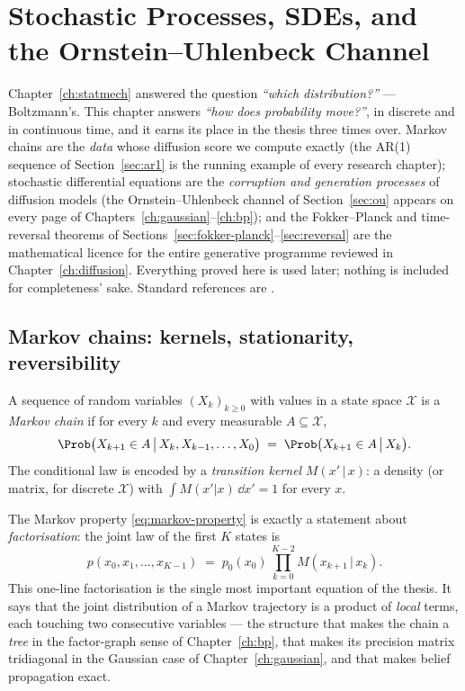 \chapter{Stochastic Processes, SDEs, and the Ornstein--Uhlenbeck Channel}
\label{ch:stochproc}\label{ch:sde}

Chapter~\ref{ch:statmech} answered the question \emph{``which
distribution?''} --- Boltzmann's. This chapter answers \emph{``how does
probability move?''}, in discrete and in continuous time, and it earns its
place in the thesis three times over. Markov chains are the \emph{data}
whose diffusion score we compute exactly (the AR(1) sequence of
Section~\ref{sec:ar1} is the running example of every research chapter);
stochastic differential equations are the \emph{corruption and generation
processes} of diffusion models (the Ornstein--Uhlenbeck channel of
Section~\ref{sec:ou} appears on every page of
Chapters~\ref{ch:gaussian}--\ref{ch:bp}); and the Fokker--Planck and
time-reversal theorems of Sections~\ref{sec:fokker-planck}--\ref{sec:reversal}
are the mathematical licence for the entire generative programme reviewed in
Chapter~\ref{ch:diffusion}. Everything proved here is used later; nothing is
included for completeness' sake. Standard references are
\citet{robert2004monte, brockwell1991time, oksendal2003stochastic,
gardiner2009stochastic, risken1996fokker}.

\section{Markov chains: kernels, stationarity, reversibility}
\label{sec:markov}

\begin{definition}
A sequence of random variables $(X_k)_{k \geq 0}$ with values in a state
space $\mathcal{X}$ is a \emph{Markov chain} if for every $k$ and every
measurable $A \subseteq \mathcal{X}$,
\begin{equation}
  \Prob\big(X_{k+1} \in A \,\big|\, X_k, X_{k-1}, \dots, X_0\big)
  \;=\; \Prob\big(X_{k+1} \in A \,\big|\, X_k\big) .
  \label{eq:markov-property}
\end{equation}
The conditional law is encoded by a \emph{transition kernel}
$M(x' \,|\, x)$: a density (or matrix, for discrete $\mathcal{X}$) with
$\int M(x'|x)\,\dd x' = 1$ for every $x$.
\end{definition}

The Markov property \eqref{eq:markov-property} is exactly a statement about
\emph{factorisation}: the joint law of the first $K$ states is
\begin{equation}
  p(x_0, x_1, \dots, x_{K-1})
  \;=\; p_0(x_0)\, \prod_{k=0}^{K-2} M(x_{k+1} \,|\, x_k) .
  \label{eq:chain-factorisation}
\end{equation}
This one-line factorisation is the single most important equation of the
thesis. It says that the joint distribution of a Markov trajectory is a
product of \emph{local} terms, each touching two consecutive variables ---
the structure that makes the chain a \emph{tree} in the factor-graph sense
of Chapter~\ref{ch:bp}, that makes its precision matrix tridiagonal in the
Gaussian case of Chapter~\ref{ch:gaussian}, and that makes belief
propagation exact.

